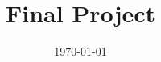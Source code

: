 \documentclass[12pt]{article}
\title{Final Project}
\date{\today}
\begin{document}
\mytitlepage



\end{document}
